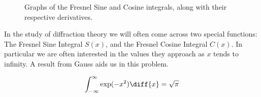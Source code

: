 \documentclass[crop=false,class=book,oneside]{standalone}
\begin{document}
            \begin{figure}[H]
                \captionsetup{type=figure}
                \centering
                \begin{subfigure}[b]{0.49\textwidth}
                    \centering
                \end{subfigure}
                \begin{subfigure}[b]{0.49\textwidth}
                    \centering
                \end{subfigure}
                \caption[Fresnel Integrals]
                    {Graphs of the Fresnel Sine and Cosine
                     integrals, along with their respective derivatives.}
                \label{fig:Diff_Theory_Graphs_of_Sinx2_and_Cosx2}
            \end{figure}
            In the study of diffraction theory
            we will often come across two
            special functions: The Fresnel Sine Integral
            $S(x)$, and the Fresnel Cosine Integral
            $C(x)$. In particular we are often interested
            in the values they approach as $x$ tends to
            infinity. A result from Gauss aids us in
            this problem.
            \begin{theorem}
                \begin{equation}
                    \int_{-\infty}^{\infty}\exp(-x^{2})\diff{x}
                    =\sqrt{\pi}
                \end{equation}
            \end{theorem}
\end{document}
